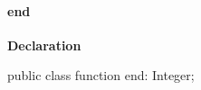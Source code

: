 \documentclass{report}
\newif\ifpdf
\begin{document}
\paragraph*{end}\hspace*{\fill}

\label{ok_prefix_identifier.TTest-end}
\begin{list}{}{
\setlength{\itemindent}{0cm}
\setlength{\listparindent}{0cm}
\setlength{\leftmargin}{\evensidemargin}
\addtolength{\leftmargin}{\tmplength}
\settowidth{\labelsep}{X}
\addtolength{\leftmargin}{\labelsep}
\setlength{\labelwidth}{\tmplength}
}
\item[\textbf{Declaration}\hfill]
\ifpdf
\begin{flushleft}
\fi
\begin{ttfamily}
public class function end: Integer;\end{ttfamily}

\ifpdf
\end{flushleft}
\fi

\end{list}
\end{document}
